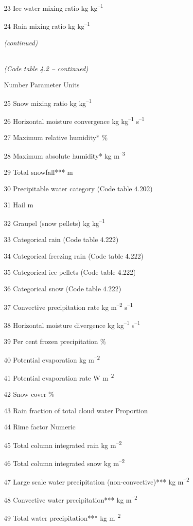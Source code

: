 23 Ice water mixing ratio kg kg\textsuperscript{--1}

24 Rain mixing ratio kg kg\textsuperscript{--1}

\emph{(continued)}

\emph{\\
(Code table 4.2 -- continued)}

Number Parameter Units

25 Snow mixing ratio kg kg\textsuperscript{--1}

26 Horizontal moisture convergence kg kg\textsuperscript{--1} s\textsuperscript{--1}

27 Maximum relative humidity* \%

28 Maximum absolute humidity* kg m\textsuperscript{--3}

29 Total snowfall*** m

30 Precipitable water category (Code table 4.202)

31 Hail m

32 Graupel (snow pellets) kg kg\textsuperscript{--1}

33 Categorical rain (Code table 4.222)

34 Categorical freezing rain (Code table 4.222)

35 Categorical ice pellets (Code table 4.222)

36 Categorical snow (Code table 4.222)

37 Convective precipitation rate kg m\textsuperscript{--2} s\textsuperscript{--1}

38 Horizontal moisture divergence kg kg\textsuperscript{--1} s\textsuperscript{--1}

39 Per cent frozen precipitation \%

40 Potential evaporation kg m\textsuperscript{--2}

41 Potential evaporation rate W m\textsuperscript{--2}

42 Snow cover \%

43 Rain fraction of total cloud water Proportion

44 Rime factor Numeric

45 Total column integrated rain kg m\textsuperscript{--2}

46 Total column integrated snow kg m\textsuperscript{--2}

47 Large scale water precipitation (non-convective)*** kg m\textsuperscript{--2}

48 Convective water precipitation*** kg m\textsuperscript{--2}

49 Total water precipitation*** kg m\textsuperscript{--2}


